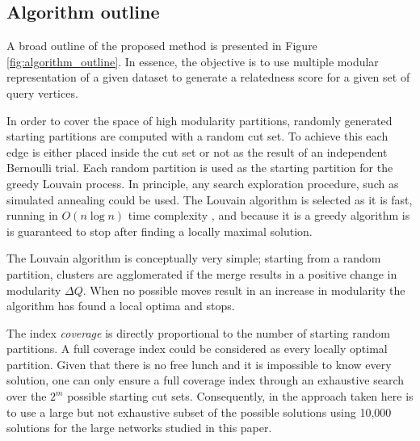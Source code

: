 \documentclass[sigconf]{acmart}
\begin{document}
\subsection{Algorithm outline}
A broad outline of the proposed method is presented in Figure \ref{fig:algorithm_outline}.
In essence, the objective is to use multiple modular representation of a given dataset to generate a relatedness score for a given set of query vertices.

In order to cover the space of high modularity partitions, randomly generated starting partitions are computed with a random cut set.
To achieve this each edge is either placed inside the cut set or not as the result of an independent Bernoulli trial. 
Each random partition is used as the starting partition for the greedy Louvain process.
In principle, any search exploration procedure, such as simulated annealing \cite{GuimeraNature2005} could be used.
The Louvain algorithm is selected as it is fast, running in $O(n \log n)$ time complexity \cite{blondel2008fast}, and because it is a greedy algorithm is is guaranteed to stop after finding a locally maximal solution.

The Louvain algorithm is conceptually very simple; starting from a random partition, clusters are agglomerated if the merge results in a positive change in modularity $\Delta Q$.
When no possible moves result in an increase in modularity the algorithm has found a local optima and stops.

The index \textit{coverage} is directly proportional to the number of starting random partitions.
A full coverage index could be considered as every locally optimal partition.
Given that there is no free lunch and it is impossible to know every solution, one can only ensure a full coverage index through an exhaustive search over the $2^m$ possible starting cut sets.
Consequently, in the approach taken here is to use a large but not exhaustive subset of the possible solutions using 10,000 solutions for the large networks studied in this paper.
\end{document}
